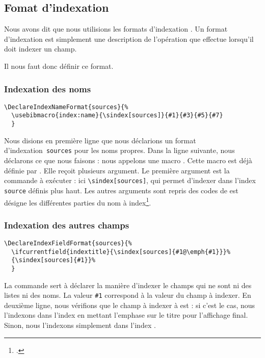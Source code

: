 \subsection{Fomat d'indexation }

Nous avons dit que nous utilisions les formats d'indexation . Un format d'indexation   est simplement une description de l'opération que  effectue lorsqu'il doit indexer un champ. 

Il nous faut donc définir ce format. 

\subsubsection{Indexation des noms}

\begin{verbatim}
\DeclareIndexNameFormat{sources}{%
  \usebibmacro{index:name}{\sindex[sources]}{#1}{#3}{#5}{#7}
  }
\end{verbatim}

Nous disions en première ligne que nous déclarions un format d'indexation \verb|sources| pour les noms propres. Dans la ligne suivante, nous déclarons ce que nous faisons : nous appelons une macro . Cette macro est déjà définie par . Elle reçoit plusieurs argument. Le première argument est la commande à exécuter : ici \verb|\sindex[sources]|, qui permet d'indexer dans l'index \verb|source| définis plus haut. Les autres arguments sont repris des codes de  est désigne les différentes parties du nom à index\footcite[Nous renvoyons le lecteur à la documentation de  : ][]{biblelatex_formats}.


\subsubsection{Indexation des autres champs}

\begin{verbatim}
\DeclareIndexFieldFormat{sources}{%
  \ifcurrentfield{indextitle}{\sindex[sources]{#1@\emph{#1}}}%
  {\sindex[sources]{#1}}%
  }
\end{verbatim}

La commande  sert à déclarer la manière d'indexer le champs qui ne sont ni des listes ni des noms. La valeur \verb|#1| correspond à la valeur du champ à indexer. En deuxième ligne, nous vérifions que le champ à indexer à est  : si c'est le cas, nous l'indexons dans l'index  en mettant l'emphase sur le titre pour l'affichage final. Sinon, nous l'indexons simplement dans l'index .

